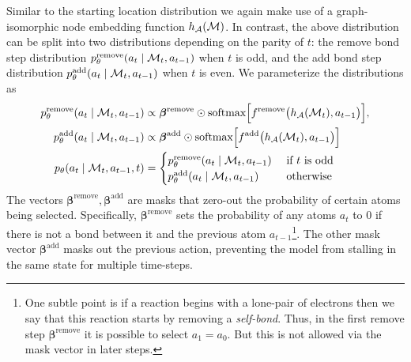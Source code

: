 Similar to the starting location distribution we again make use of a graph-isomorphic node embedding function $h_{{\mathcal{A}}}({\mathcal{M}})$. 
In contrast, the above distribution can be split into two distributions depending on the parity of $t$:
the remove bond step distribution $p_\theta^\textrm{remove}(a_t \mid  {\mathcal{M}}_t, a_{t-1})$ when $t$ is odd, 
and the add bond step distribution $p_\theta^\textrm{add}(a_t \mid {\mathcal{M}}_t, a_{t-1})$ when $t$ is even. We parameterize the distributions as
\begin{align}
p_\theta^\textrm{remove}(a_t \mid  {\mathcal{M}}_t, a_{t-1}) &\propto \bm{\beta}^\textrm{remove} \odot \mbox{softmax}\Big[f^\textrm{remove}\big(h_{{\mathcal{A}}}({\mathcal{M}}_t), a_{t-1}\big)\Big], \\
p_\theta^\textrm{add}(a_t \mid {\mathcal{M}}_t, a_{t-1}) &\propto \bm{\beta}^\textrm{add} \odot \mbox{softmax}\Big[f^\textrm{add}\big(h_{{\mathcal{A}}}({\mathcal{M}}_t), a_{t-1}\big)\Big] \\
p_\theta(a_t \mid {\mathcal{M}}_{t}, a_{t-1}, t) &= 
\begin{cases}
p_\theta^\textrm{remove}(a_t \mid  {\mathcal{M}}_t, a_{t-1}) & \mbox{ if } t \mbox{ is odd} \\
p_\theta^\textrm{add}(a_t \mid {\mathcal{M}}_t, a_{t-1}) & \mbox{ otherwise }
\end{cases}
\end{align}
The vectors $\bm{\beta}^\textrm{remove},\bm{\beta}^\textrm{add}$ are masks that zero-out the probability of certain atoms being selected. Specifically, $\bm{\beta}^\mathrm{remove}$ sets the probability of any atoms $a_t$ to 0 if there is not a bond between it and the previous atom $a_{t-1}$\footnote{One subtle point is if a reaction begins with a lone-pair of electrons then we say that this reaction starts by removing a \emph{self-bond}. Thus, in the first remove step $\bm{\beta}^\mathrm{remove}$ it is possible to select $a_1 \!=\! a_0$. But this is not allowed via the mask vector in later steps.}. The other mask vector $\bm{\beta}^\textrm{add}$ masks out the previous action, preventing the model from stalling in the same state for multiple time-steps. %




